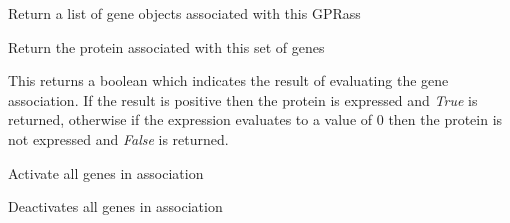 \documentclass[a4paper,11pt,english]{sphinxmanual}
\begin{document}
\begin{fulllineitems}
\begin{fulllineitems}
\end{fulllineitems}


\begin{fulllineitems}
\label{modules_doc:cbmpy.CBModel.GeneProteinAssociation.getGenes}
Return a list of gene objects associated with this GPRass

\end{fulllineitems}


\begin{fulllineitems}
\label{modules_doc:cbmpy.CBModel.GeneProteinAssociation.getProtein}
Return the protein associated with this set of genes

\end{fulllineitems}


\begin{fulllineitems}
\label{modules_doc:cbmpy.CBModel.GeneProteinAssociation.isProteinActive}
This returns a boolean which indicates the result of evaluating the gene association. If the result is positive
then the protein is expressed and \emph{True} is returned, otherwise if the expression evaluates to a value of 0 then
the protein is not expressed and  \emph{False} is returned.

\end{fulllineitems}


\begin{fulllineitems}
\label{modules_doc:cbmpy.CBModel.GeneProteinAssociation.setAllGenesActive}
Activate all genes in association

\end{fulllineitems}


\begin{fulllineitems}
\label{modules_doc:cbmpy.CBModel.GeneProteinAssociation.setAllGenesInactive}
Deactivates all genes in association


\end{fulllineitems}
\end{fulllineitems}
\end{document}
